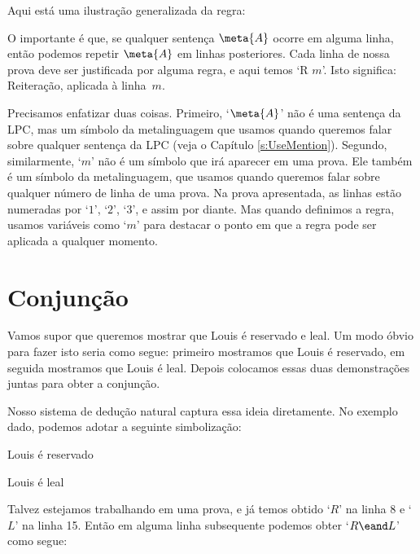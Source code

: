  Aqui está uma ilustração generalizada da regra:

\begin{fitchproof}
	 
\end{fitchproof}
O importante é que, se qualquer sentença $\meta{A}$ ocorre em alguma linha, então podemos repetir $\meta{A}$ em linhas posteriores. Cada linha de nossa prova deve  ser justificada por alguma regra, e aqui temos `R $m$'.   Isto significa:  Reiteração, aplicada à linha~$m$. 

 Precisamos enfatizar duas coisas.  Primeiro,   `$\meta{A}$'   não   é uma sentença da LPC,   mas um símbolo da metalinguagem que usamos quando queremos falar sobre qualquer sentença da LPC
 (veja o Capítulo \ref{s:UseMention}).   Segundo, similarmente,  `$m$'  não é um símbolo que irá aparecer em uma prova.  Ele também é um símbolo da metalinguagem, que usamos quando queremos falar sobre qualquer número de linha de uma prova. Na prova apresentada, as linhas  estão numeradas por `$1$', `$2$', `$3$', e assim por diante.  Mas quando definimos a regra, usamos variáveis como   `$m$' para destacar o ponto em que a regra pode ser aplicada a qualquer momento. 

\section{Conjunção}
  Vamos supor que queremos mostrar que Louis é reservado e leal. Um modo óbvio para fazer isto seria como segue: primeiro mostramos que Louis é reservado, em seguida mostramos que Louis é leal. Depois colocamos essas duas demonstrações juntas para obter a conjunção.

Nosso sistema de dedução natural  captura  essa ideia diretamente. No exemplo dado, podemos adotar a seguinte simbolização:
	\begin{ekey}
		\item[R] Louis é reservado
		\item[L] Louis é leal
	\end{ekey}
 Talvez estejamos trabalhando em uma prova, e já temos obtido `$R$'  na linha 8 e `$L$' na linha 15. Então  em alguma linha subsequente podemos obter  `$R \eand L$' como segue:
\begin{fitchproof}
	 
\end{fitchproof}

